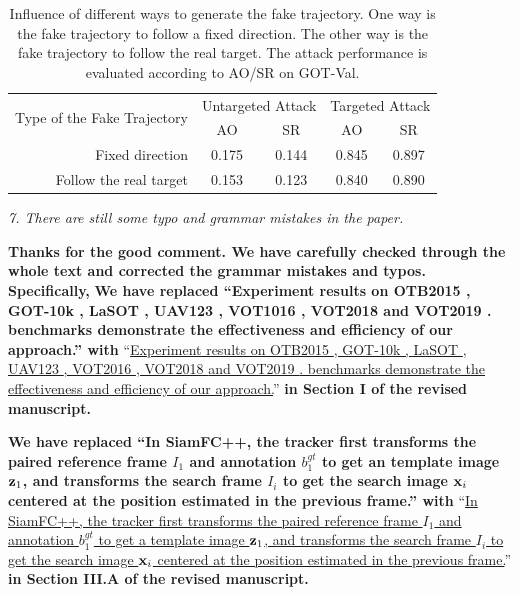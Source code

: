 \documentclass[12pt]{article}
\begin{document}
\begin{table}[t]
  \renewcommand\thetable{\ref{table:direction}}
  \centering
  \caption{Influence of different ways to generate the fake trajectory. One way is the fake trajectory to follow a fixed direction. The other way is the fake trajectory to follow the real target. The attack performance is evaluated according to AO/SR on GOT-Val.}
  \begin{tabular}{@{}rcccc@{}}
  \toprule
  \multirow{2}{*}[-2pt]{Type of the Fake Trajectory} & \multicolumn{2}{c}{Untargeted Attack} & \multicolumn{2}{c}{Targeted Attack} \\ \cmidrule{2-5}
                              & AO                & SR                & AO               & SR               \\ \midrule
  Fixed direction             & 0.175             & 0.144             & 0.845            & 0.897            \\
  Follow the real target      & 0.153             & 0.123             & 0.840            & 0.890            \\ \bottomrule        
  \end{tabular}
\end{table}

\textit{7. There are still some typo and grammar mistakes in the paper.}

\textbf{Thanks for the good comment. We have carefully checked through the whole text and corrected the grammar mistakes and typos. Specifically,}
\textbf{We have replaced ``Experiment results on OTB2015 \cite{OTB}, GOT-10k \cite{GOT-10k}, LaSOT \cite{GOT-10k}, UAV123 \cite{UAV123}, VOT1016 \cite{VOT2016}, VOT2018 \cite{VOT2018} and VOT2019 \cite{VOT2019}. benchmarks demonstrate the effectiveness and efficiency of our approach.'' with}
``\uline{Experiment results on OTB2015 \cite{OTB}, GOT-10k \cite{GOT-10k}, LaSOT \cite{LaSOT}, UAV123 \cite{UAV123}, VOT2016 \cite{VOT2016}, VOT2018 \cite{VOT2018} and VOT2019 \cite{VOT2019}. benchmarks demonstrate the effectiveness and efficiency of our approach.}''
\textbf{in Section I of the revised manuscript.}

\textbf{We have replaced ``In SiamFC++, the tracker first transforms the paired reference frame $I_1$ and annotation $b_1^{gt}$ to get an template image $\textbf z_1$, and transforms the search frame $I_i$ to get the search image $\textbf x_i$ centered at the position estimated in the previous frame.'' with}
``\uline{In SiamFC++, the tracker first transforms the paired reference frame $I_1$ and annotation $b_1^{gt}$ to get a template image $\textbf z_1$, and transforms the search frame $I_i$ to get the search image $\textbf x_i$ centered at the position estimated in the previous frame.}''
\textbf{in Section III.A of the revised manuscript.}
\end{document}
